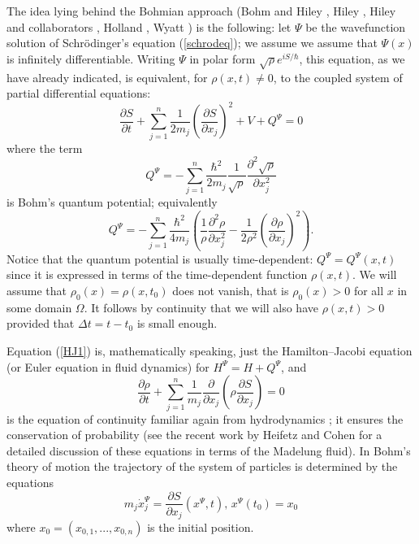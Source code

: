 \documentclass[12pt]{article}%
\begin{document}
The idea lying behind the Bohmian approach (Bohm and Hiley \cite{BoHi}, Hiley
\cite{Hiley1}, Hiley and collaborators \cite{hica,hicama}, Holland
\cite{Holland}, Wyatt \cite{Wyatt}) is the following: let $\Psi$ be the
wavefunction solution of Schr\"{o}dinger's equation (\ref{schrodeq}); we
assume we assume that $\Psi(x)$ is infinitely differentiable. Writing $\Psi$
in polar form $\sqrt{\rho}e^{iS/\hbar}$, this equation, as we have already
indicated, is equivalent, for $\rho(x,t)\neq0$, to the coupled system of
partial differential equations:
\begin{equation}
\frac{\partial S}{\partial t}+\sum_{j=1}^{n}\frac{1}{2m_{j}}\left(
\frac{\partial S}{\partial x_{j}}\right)  ^{2}+V+Q^{\Psi}=0\label{HJ1}%
\end{equation}
where the term
\begin{equation}
Q^{\Psi}=-\sum_{j=1}^{n}\frac{\hbar^{2}}{2m_{j}}\frac{1}{\sqrt{\rho}}%
\frac{\partial^{2}\sqrt{\rho}}{\partial x_{j}^{2}}\label{qp}%
\end{equation}
is Bohm's quantum potential; equivalently
\begin{equation}
Q^{\Psi}=-\sum_{j=1}^{n}\frac{\hbar^{2}}{4m_{j}}\left(  \frac{1}{\rho}%
\frac{\partial^{2}\rho}{\partial x_{j}^{2}}-\frac{1}{2\rho^{2}}\left(
\frac{\partial\rho}{\partial x_{j}}\right)  ^{2}\right)  .\label{qpbis}%
\end{equation}
Notice that the quantum potential is usually time-dependent: $Q^{\Psi}%
=Q^{\Psi}(x,t)$ since it is expressed in terms of the time-dependent function
$\rho(x,t)$. We will assume that $\rho_{0}(x)=\rho(x,t_{0})$ does not vanish,
that is $\rho_{0}(x)>0$ for all $x$ in some domain $\Omega$. It follows by
continuity that we will also have $\rho(x,t)>0$ provided that $\Delta
t=t-t_{0}$ is small enough.

Equation (\ref{HJ1}) is, mathematically speaking, just the Hamilton--Jacobi
equation (or Euler equation in fluid dynamics) for $H^{\Psi}=H+Q^{\Psi}$, and
\begin{equation}
\frac{\partial\rho}{\partial t}+\sum_{j=1}^{n}\frac{1}{m_{j}}\frac{\partial
}{\partial x_{j}}\left(  \rho\frac{\partial S}{\partial x_{j}}\right)  =0
\label{CO1}%
\end{equation}
is the equation of continuity familiar again from hydrodynamics \cite{fluid};
it ensures the conservation of probability (see the recent work by Heifetz and
Cohen \cite{heco16} for a detailed discussion of these equations in terms of
the Madelung fluid). In Bohm's theory of motion the trajectory of the system
of particles is determined by the equations
\begin{equation}
m_{j}\dot{x}_{j}^{\Psi}=\frac{\partial S}{\partial x_{j}}(x^{\Psi},t)\text{
\ , \ }x^{\Psi}(t_{0})=x_{0} \label{Bohm}%
\end{equation}
where $x_{0}=(x_{0,1},...,x_{0,n})$ is the initial position.
\end{document}
